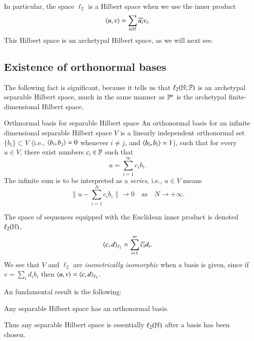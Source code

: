 In particular, the space $\ell_2$ is a Hilbert space when we use the inner product
\begin{equation}
    \braket{u,v} = \sum_{i\in\mathbb{N}} \overline{u_i} v_i.
\end{equation}
This Hilbert space is an archetypal Hilbert space, as we will next see.

\subsection{Existence of orthonormal bases}


The following fact is significant, because it tells us that $\ell_2(\mathbb{N};\mathbb{F})$ is an archetypal separable Hilbert space, much in the same manner as $\mathbb{F}^n$ is the archetypal finite-dimensional Hilbert space.


\begin{myDefinition}{Orthnormal basis for separable Hilbert space}{}
An orthonormal basis for an infinite dimensional separable Hilbert space $V$ is a linearly independent orthonormal set $\{b_i\}\subset V$ (i.e., $\braket{b_i,b_j} = 0$ whenever $i\neq j$, and $\braket{b_i,b_i} = 1$), such that for every $u \in V$, there exist numbers $c_i \in \mathbb{F}$ such that
\begin{equation}
    u = \sum_{i=1}^\infty c_i b_i.
\end{equation}
The infinite sum is to be interpreted as a \emph{series}, i.e., $u \in V$ means
\begin{equation}
    \|u - \sum_{i=1}^N c_i b_i\| \to 0 \quad \text{as} \quad N\to+\infty.
\end{equation}

The space of sequences equipped with the Euclidean inner product is denoted $\ell_2(\mathbb{N})$,
\begin{equation}
    \braket{c,d}_{\ell_2} = \sum_{i=1}^\infty \overline{c_i} d_i.
\end{equation}
We see that $V$ and $\ell_2$ are \emph{isometrically isomorphic} when a basis is given, since if $v = \sum_i d_i b_i$ then $\braket{u,v}= \braket{c,d}_{\ell_2}$.
\end{myDefinition}

An fundamental result is the following:
\begin{myTheorem}{}{}
Any separable Hilbert space has an orthonormal basis.
\end{myTheorem}
Thus any separable Hilbert space is essentially $\ell_2(\mathbb{N})$ after a basis has been chosen.  






